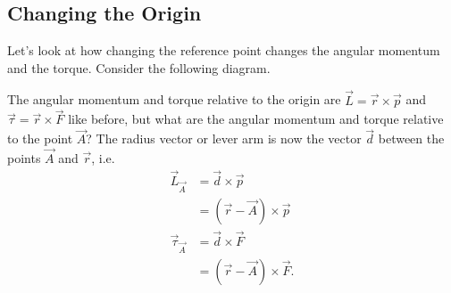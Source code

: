 \documentclass[../classical_mechanics.tex]{subfiles}
\begin{document}
        \subsection{Changing the Origin}\label{subsec:changing-the-origin}
            Let's look at how changing the reference point changes the angular momentum and the torque.
            Consider the following diagram.
            \begin{figure}[H]
                \centering
            \end{figure}
            The angular momentum and torque relative to the origin are $\vec{L}=\vec{r}\times\vec{p}$ and $\vec{\tau}=\vec{r}\times\vec{F}$ like before, but what are the angular momentum and torque relative to the point $\vec{A}$?
            The radius vector or lever arm is now the vector $\vec{d}$ between the points $\vec{A}$ and $\vec{r}$, i.e.
            \begin{align}
                \vec{L}_{\vec{A}}&=\vec{d}\times\vec{p}\\
                &=(\vec{r}-\vec{A})\times\vec{p}\\
                \vec{\tau}_{\vec{A}}&=\vec{d}\times\vec{F}\\
                &=(\vec{r}-\vec{A})\times\vec{F}.
            \end{align}
\end{document}
